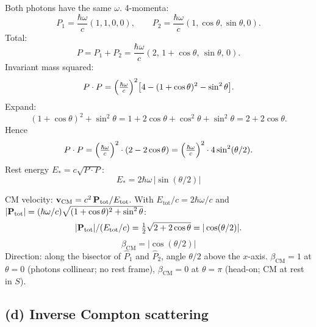 \documentclass[11pt]{article}
\begin{document}
Both photons have the same $\omega$. 4-momenta:
\[ P_1 = \frac{\hbar\omega}{c}(1,1,0,0), \qquad P_2 = \frac{\hbar\omega}{c}(1,\cos\theta,\sin\theta,0). \]
Total:
\[ P = P_1+P_2 = \frac{\hbar\omega}{c}(2,\,1+\cos\theta,\,\sin\theta,\,0). \]
Invariant mass squared:
\[ P\cdot P = \Bigl(\tfrac{\hbar\omega}{c}\Bigr)^2\bigl[4 - (1+\cos\theta)^2 - \sin^2\theta\bigr]. \]
Expand:
\[ (1+\cos\theta)^2 + \sin^2\theta = 1 + 2\cos\theta + \cos^2\theta + \sin^2\theta = 2 + 2\cos\theta. \]
Hence
\[ P\cdot P = \Bigl(\tfrac{\hbar\omega}{c}\Bigr)^2\cdot(2 - 2\cos\theta) = \Bigl(\tfrac{\hbar\omega}{c}\Bigr)^2\cdot 4\sin^2(\theta/2). \]
Rest energy $E_* = c\sqrt{P\cdot P}$:
\[ \boxed{\;E_* = 2\hbar\omega\,|\sin(\theta/2)|\;} \]

CM velocity: $\vb v_\text{CM} = c^2\,\vb P_\text{tot}/E_\text{tot}$. With $E_\text{tot}/c = 2\hbar\omega/c$ and $|\vb P_\text{tot}| = (\hbar\omega/c)\sqrt{(1+\cos\theta)^2 + \sin^2\theta}$:
\[ |\vb P_\text{tot}|/(E_\text{tot}/c) = \tfrac{1}{2}\sqrt{2+2\cos\theta} = |\cos(\theta/2)|. \]
\[ \boxed{\;\beta_\text{CM} = |\cos(\theta/2)|\;} \]
Direction: along the bisector of $\hat P_1$ and $\hat P_2$, angle $\theta/2$ above the $x$-axis. $\beta_\text{CM} = 1$ at $\theta=0$ (photons collinear; no rest frame), $\beta_\text{CM}=0$ at $\theta=\pi$ (head-on; CM at rest in $S$).

\begin{center}
\end{center}

\subsection*{(d) Inverse Compton scattering}
\end{document}

